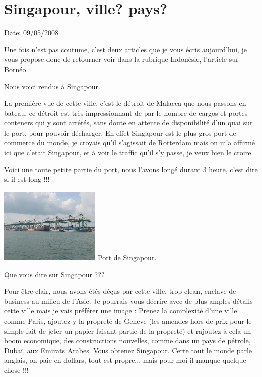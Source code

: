 \section{Singapour, ville? pays?}

Date: 09/05/2008

\begin{multicols}{2}

Une fois n'est pas coutume, c'est deux articles que je vous écris aujourd'hui, je vous propose donc de retourner voir dans la rubrique Indonésie, l'article sur Bornéo.

Nous voici rendus à Singapour.

La première vue de cette ville, c'est le détroit de Malacca que nous passons en bateau, ce détroit est très impressionnant de par le nombre de cargos et portes conteners qui y sont arrétés, sans doute en attente de disponibilité d'un quai sur le port, pour pouvoir décharger. En effet Singapour est le plus gros port de commerce du monde, je croyais qu'il s'agissait de Rotterdam mais on m'a affirmé ici que c'etait Singapour, et à voir le traffic qu'il s'y passe, je veux bien le croire.


Voici une toute petite partie du port, nous l'avons longé durant 3 heure, c'est dire si il est long !!!

\hspace*{-0.65cm}
\includegraphics[width=4.8cm]{articles/Singapour-ville-pays/1210333644359c.jpg}
Port de Singapour.


Que vous dire sur Singapour ???

Pour être clair, nous avons étés déçus par cette ville, trop clean, enclave de business au milieu de l'Asie. Je pourrais vous décrire avec de plus amples détails cette ville mais je vais préférer une image : Prenez la complexité d'une ville comme Paris, ajoutez y la propreté de Geneve (les amendes hors de prix pour le simple fait de jeter un papier faisant partie de la propreté) et rajoutez à cela un boom economique, des constructions nouvelles, comme dans un pays de pétrole, Dubaï, aux Emirats Arabes. Vous obtenez Singapour. Certe tout le monde parle anglais, on paie en dollars, tout est propre... mais pour moi il manque quelque chose !!!


\end{multicols}

